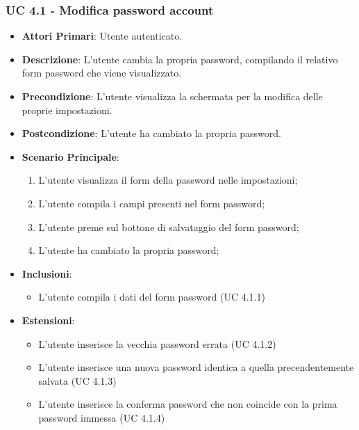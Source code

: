 			\subsubsection{UC 4.1 - Modifica password account}
			\begin{itemize}
				\item \textbf{Attori Primari}: Utente autenticato.
				\item \textbf{Descrizione}: L'utente cambia la propria password, compilando il relativo form password che viene visualizzato.
				\item \textbf{Precondizione}: L'utente visualizza la schermata per la modifica delle proprie impostazioni.
				\item \textbf{Postcondizione}: L'utente ha cambiato la propria password.
				\item \textbf{Scenario Principale}:
				\begin{enumerate}
					\item L'utente visualizza il form della password nelle impostazioni;
					\item L'utente compila i campi presenti nel form password;
					\item L'utente preme sul bottone di salvataggio del form password;
					\item L'utente ha cambiato la propria password;
				\end{enumerate}	
				\item \textbf{Inclusioni}:
					\begin{itemize}
						\item L'utente compila i dati del form password (UC 4.1.1)
					\end{itemize}
				\item \textbf{Estensioni}:
					\begin{itemize}
						\item L'utente inserisce la vecchia password errata (UC 4.1.2)
						\item L'utente inserisce una nuova password identica a quella precendentemente salvata (UC 4.1.3)
						\item L'utente inserisce la conferma password che non coincide con la prima password immessa (UC 4.1.4)
					\end{itemize}
			\end{itemize}

